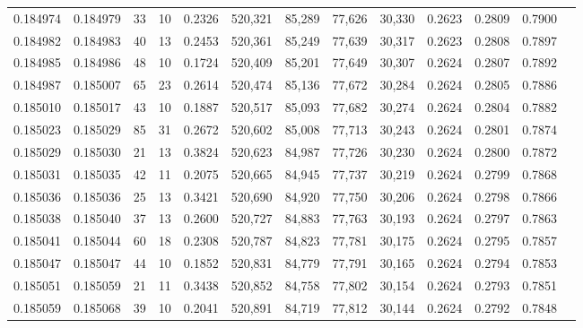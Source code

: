 \begin{tabular}{rrrrrrrrrrrrr}
0.184974 & 0.184979 &    33 &  10 &                                     0.2326 & 520,321 &  85,289 &  77,626 &  30,330 & 0.2623 & 0.2809 & 0.7900 \\
0.184982 & 0.184983 &    40 &  13 &                                     0.2453 & 520,361 &  85,249 &  77,639 &  30,317 & 0.2623 & 0.2808 & 0.7897 \\
0.184985 & 0.184986 &    48 &  10 &                                     0.1724 & 520,409 &  85,201 &  77,649 &  30,307 & 0.2624 & 0.2807 & 0.7892 \\
0.184987 & 0.185007 &    65 &  23 &                                     0.2614 & 520,474 &  85,136 &  77,672 &  30,284 & 0.2624 & 0.2805 & 0.7886 \\
0.185010 & 0.185017 &    43 &  10 &                                     0.1887 & 520,517 &  85,093 &  77,682 &  30,274 & 0.2624 & 0.2804 & 0.7882 \\
0.185023 & 0.185029 &    85 &  31 &                                     0.2672 & 520,602 &  85,008 &  77,713 &  30,243 & 0.2624 & 0.2801 & 0.7874 \\
0.185029 & 0.185030 &    21 &  13 &                                     0.3824 & 520,623 &  84,987 &  77,726 &  30,230 & 0.2624 & 0.2800 & 0.7872 \\
0.185031 & 0.185035 &    42 &  11 &                                     0.2075 & 520,665 &  84,945 &  77,737 &  30,219 & 0.2624 & 0.2799 & 0.7868 \\
0.185036 & 0.185036 &    25 &  13 &                                     0.3421 & 520,690 &  84,920 &  77,750 &  30,206 & 0.2624 & 0.2798 & 0.7866 \\
0.185038 & 0.185040 &    37 &  13 &                                     0.2600 & 520,727 &  84,883 &  77,763 &  30,193 & 0.2624 & 0.2797 & 0.7863 \\
0.185041 & 0.185044 &    60 &  18 &                                     0.2308 & 520,787 &  84,823 &  77,781 &  30,175 & 0.2624 & 0.2795 & 0.7857 \\
0.185047 & 0.185047 &    44 &  10 &                                     0.1852 & 520,831 &  84,779 &  77,791 &  30,165 & 0.2624 & 0.2794 & 0.7853 \\
0.185051 & 0.185059 &    21 &  11 &                                     0.3438 & 520,852 &  84,758 &  77,802 &  30,154 & 0.2624 & 0.2793 & 0.7851 \\
0.185059 & 0.185068 &    39 &  10 &                                     0.2041 & 520,891 &  84,719 &  77,812 &  30,144 & 0.2624 & 0.2792 & 0.7848 \\

\end{tabular}
